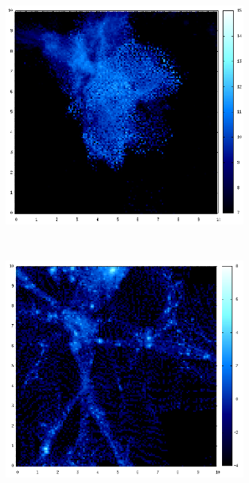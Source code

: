 \documentclass[journal]{IEEEtran}
\begin{document}
\begin{figure}[htb]
\begin{subfigure}[t]{0.25\textwidth}
	\end{subfigure}
	\quad
	\begin{subfigure}[t]{0.25\textwidth}
		\centering
		\includegraphics[width=\linewidth]{TEMP07-08.png}
	\end{subfigure}
	\\
	\begin{subfigure}[t]{0.25\textwidth}
		\centering
		\includegraphics[width=\linewidth]{DM08-09.png}

\end{subfigure}
\end{figure}
\end{document}
